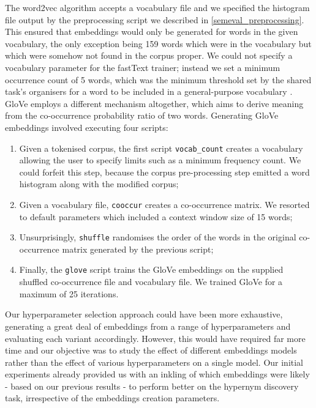 The word2vec algorithm accepts a vocabulary file and we specified the histogram file output by the preprocessing script we described in \cref{semeval_preprocessing}.  This ensured that embeddings would only be generated for words in the given vocabulary, the only exception being 159 words which were in the vocabulary but which were somehow not found in the corpus proper.  We could not specify a vocabulary parameter for the fastText trainer; instead we set a minimum occurrence count of 5 words, which was the minimum threshold set by the shared task's organisers for a word to be included in a general-purpose vocabulary \citep{camacho2018semeval}.  
GloVe employs a different mechanism altogether, which aims to derive meaning from the co-occurrence probability ratio of two words.  Generating GloVe embeddings involved executing four scripts:
\begin{enumerate}
    \item Given a tokenised corpus, the first script \texttt{vocab\_count} creates a vocabulary allowing the user to specify limits such as a minimum frequency count.  We could forfeit this step, because the corpus pre-processing step emitted a word histogram along with the modified corpus;
    \item Given a vocabulary file, \texttt{cooccur} creates a co-occurrence matrix.  We resorted to default parameters which included a context window size of 15 words;
    \item Unsurprisingly, \texttt{shuffle} randomises the order of the words in the original co-occurrence matrix generated by the previous script;
    \item Finally, the \texttt{glove} script trains the GloVe embeddings on the supplied shuffled co-occurrence file and vocabulary file.  We trained GloVe for a maximum of 25 iterations.  
\end{enumerate}

Our hyperparameter selection approach could have been more exhaustive, generating a great deal of embeddings from a range of hyperparameters and evaluating each variant accordingly.  However, this would have required far more time and our objective was to study the effect of different embeddings models rather than the effect of various hyperparameters on a single model.  Our initial experiments already provided us with an inkling of which embeddings were likely - based on our previous results - to perform better on the hypernym discovery task, irrespective of the embeddings creation parameters.

